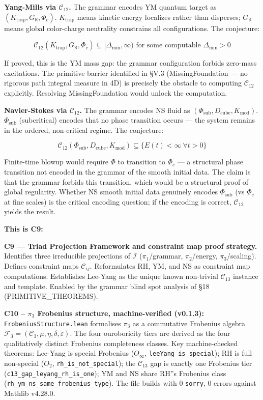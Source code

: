 \documentclass[12pt,a4paper]{article}
\newcommand{\pilcrow}{\S}
\begin{document}
\textbf{Yang-Mills via $\mathcal{C}_{12}$.} The grammar encodes YM quantum target as $(K_\text{trap}, G_{\aleph}, \Phi_c)$. $K_\text{trap}$ means kinetic energy localizes rather than disperses; $G_{\aleph}$ means global color-charge neutrality constrains all configurations. The conjecture:

\[\mathcal{C}_{12}(K_\text{trap}, G_{\aleph}, \Phi_c) \subseteq [\Delta_\text{min}, \infty) \text{ for some computable } \Delta_\text{min} > 0\]

If proved, this is the YM mass gap: the grammar configuration forbids zero-mass excitations. The primitive barrier identified in \pilcrow{}V.3 (MissingFoundation --- no rigorous path integral measure in 4D) is precisely the obstacle to computing $\mathcal{C}_{12}$ explicitly. Resolving MissingFoundation would unlock the computation.

\textbf{Navier-Stokes via $\mathcal{C}_{12}$.} The grammar encodes NS fluid as $(\Phi_\text{sub}, D_\text{cube}, K_\text{mod})$. $\Phi_\text{sub}$ (subcritical) encodes that no phase transition occurs --- the system remains in the ordered, non-critical regime. The conjecture:

\[\mathcal{C}_{12}(\Phi_\text{sub}, D_\text{cube}, K_\text{mod}) \subseteq \{ E(t) < \infty\ \forall t > 0 \}\]

Finite-time blowup would require $\Phi$ to transition to $\Phi_c$ --- a structural phase transition not encoded in the grammar of the smooth initial data. The claim is that the grammar forbids this transition, which would be a structural proof of global regularity. Whether NS smooth initial data genuinely encodes $\Phi_\text{sub}$ (vs $\Phi_c$ at fine scales) is the critical encoding question; if the encoding is correct, $\mathcal{C}_{12}$ yields the result.

\textbf{This is C9:}

\textbf{C9 --- Triad Projection Framework and constraint map proof strategy.} Identifies three irreducible projections of $\mathcal{I}$ ($\pi_1$/grammar, $\pi_2$/energy, $\pi_3$/scaling). Defines constraint maps $\mathcal{C}_{ij}$. Reformulates RH, YM, and NS as constraint map computations. Establishes Lee-Yang as the unique known non-trivial $\mathcal{C}_{13}$ instance and template. Enabled by the grammar blind spot analysis of \pilcrow{}18 (PRIMITIVE\_THEOREMS).

\textbf{C10  --  $\pi_3$ Frobenius structure, machine-verified (v0.1.3):} \texttt{FrobeniusStructure.lean} formalises $\pi_3$ as a commutative Frobenius algebra $\mathcal{F}_3 = (\mathcal{C}_3, \mu, \eta, \delta, \varepsilon)$. The four ouroboricity tiers are derived as the four qualitatively distinct Frobenius completeness classes. Key machine-checked theorems: Lee-Yang is special Frobenius ($O_{\infty}$, \texttt{leeYang\_is\_special}); RH is full non-special ($O_2$, \texttt{rh\_is\_not\_special}); the $\mathcal{C}_{13}$ gap is exactly one Frobenius tier (\texttt{c13\_gap\_leyang\_rh\_is\_one}); YM and NS share RH''s Frobenius class (\texttt{rh\_ym\_ns\_same\_frobenius\_type}). The file builds with 0 \texttt{sorry}, 0 errors against Mathlib v4.28.0.
\end{document}
